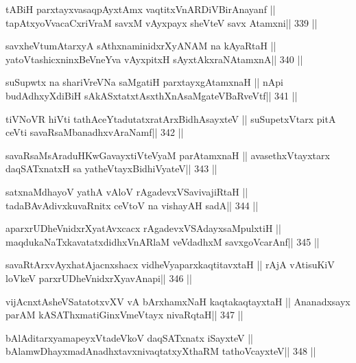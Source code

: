 \begin{shl}
tABiH parxtayxvasaqpAyx\s\s tAmx vaqtitxVnARDiVBirAnayanf ||
tapAtxyoVvacaCxriVraM savxM vAyxpayx sheVteV savx Atamxni\hfill || 339 ||
\end{shl}

\begin{shl}
savxheVtumAtarxyA sAthxnaminidxrXyANAM na kAyaRtaH ||
yatoV\s tashicxninxBeVneYva vAyxpitxH sAyxtAkxraNAtamxnA\hfill || 340 ||
\end{shl}

\begin{shl}
suSupwtx na shariVreVNa saMgatiH parxtayxgAtamxnaH ||
nApi budAdhxyXdiBiH sAkASxtatxtAsxthXnAsaMgateVBaRveVtf\hfill || 341 ||
\end{shl}

\begin{shl}
tiVNoVR hiVti tathAceYtadutatxratArxBidhAsayxteV ||
suSupetxV\s tarx pitA ceVti savaRsaMbanadhxvAraNamf\hfill || 342 ||
\end{shl}

\begin{shl}
savaRsaMsAraduHKwGavayxtiVteVyaM parA\s\s tamxnaH ||
avasethxVtayxtarx daqSATxnatxH sa yatheVtayxBidhiVyateV\hfill || 343 ||
\end{shl}

\begin{shl}
satxnaMdhayoV yathA vAloV rAgadevxVSavivajiRtaH ||
tadaBAvAdivxkuvaRnitx ceVtoV na vishayAH sadA\hfill || 344 ||
\end{shl}

\begin{shl}
aparxrUDheVnidxrXyatAvxcacx rAgadevxVSAdayxsaMpulxtiH ||
maqdukaNaTxkavatatxdidhxVnARlaM veVdadhxM savxgoVcarAnf\hfill || 345 ||
\end{shl}

\begin{shl}
savaRtArxvAyxhatAjacnxshacx vidheVyaparxkaqtitavxtaH ||
rAjA vA\s tisuKiV loVkeV parxrUDheVnidxrXyavAnapi\hfill || 346 ||
\end{shl}

\begin{shl}
vijAcnxtAsheVSatatotxvXV vA bArxhamxNaH kaqtakaqtayxtaH ||
Ananadxsayx parAM kASAThxmatiGinxVmeVtayx nivaRqtaH\hfill || 347 ||
\end{shl}

\begin{shl}
bAlAditarxyamapeyxVtadeVkoV daqSATxnatx iSayxteV ||
bAlamwDhayxmadAnadhxtavxnivaqtatxyXthaRM tathoVcayxteV\hfill || 348 ||
\end{shl}

